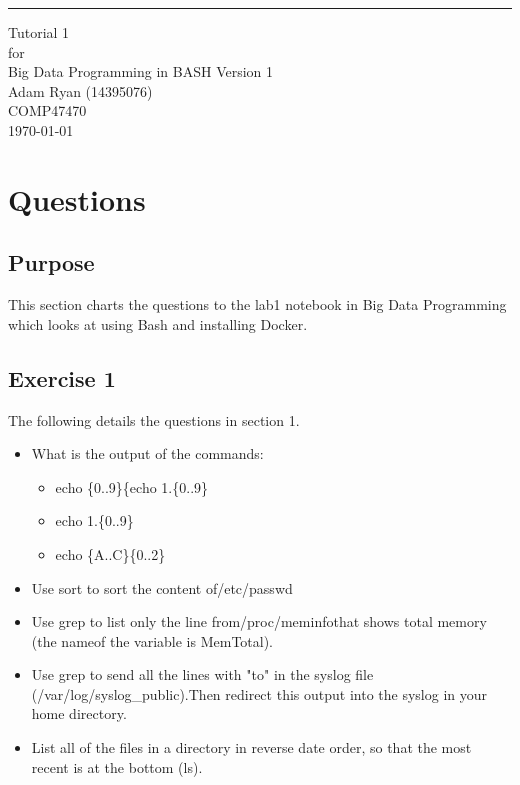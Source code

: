 \documentclass{scrreprt}
\date{}
\def\myversion{1 }
\begin{document}
\begin{flushright}
    \rule{16cm}{5pt}\vskip1cm
    \begin{bfseries}
        \Huge{Tutorial 1\\}
        \vspace{1.9cm}
        for\\
        \vspace{1.9cm}
        Big Data Programming in BASH
        \vspace{1.9cm}
        \LARGE{Version \myversion}\\
        \vspace{1.9cm}
        Adam Ryan (14395076)\\
        \vspace{1.9cm}
        COMP47470\\
        \vspace{1.9cm}
        \today\\
    \end{bfseries}
\end{flushright}

\tableofcontents

\chapter{Questions}\label{Intro}

\section{Purpose}\label{Purpose}
This section charts the questions to the lab1 notebook in Big Data Programming which looks at using Bash and installing Docker.

\section{Exercise 1}\label{Overview}
The following details the questions in section 1.
\begin{itemize}
	\item What is the output of the commands:
	\begin{itemize}
		\item echo \{0..9\}\{echo 1.\{0..9\}
		\item echo 1.\{0..9\}
		\item echo \{A..C\}\{0..2\}
	\end{itemize}
	\item Use sort to sort the content of/etc/passwd
	\item Use grep to list only the line from/proc/meminfothat shows total memory (the nameof the variable is MemTotal).
	\item Use grep to send all the lines with "to" in the syslog file (/var/log/syslog\_public).Then redirect this output into the syslog in your home directory.
	\item List all of the files in a directory in reverse date order, so that the most recent is at the bottom (ls).
\end{itemize}
\end{document}
